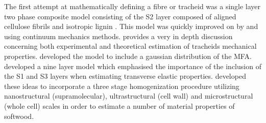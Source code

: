  The first attempt at mathematically defining a fibre or tracheid was a single layer two phase composite model consisting of the S2 layer composed of aligned cellulose fibrils and isotropic lignin \cite{Barber_1964}. This model was quickly improved on by \cite{mark1967cell} and \cite{Cave_1968} using continuum mechanics methods. \cite{mark1967cell} provides a very in depth discussion concerning both experimental and theoretical estimation of tracheids mechanical properties. \cite{Cave_1968} developed the model to include a gaussian distribution of the MFA. \cite{bergander2002cell} developed a nine layer model which emphasised the importance of the inclusion of the S1 and S3 layers when estimating transverse elastic properties. \cite{harrington2002hierarchical} developed these ideas to incorporate a three stage homogenization procedure utilizing nanostructural (supramolecular), ultrastructural (cell wall) and microstructural (whole cell) scales in order to estimate a number of material properties of softwood.
 
 

 
